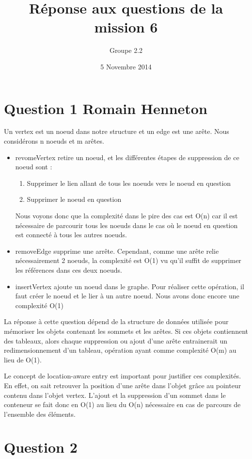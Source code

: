 \documentclass[10pt,a4paper]{article}
\date{5 Novembre 2014}
\author{Groupe 2.2}
\title{Réponse aux questions de la mission 6}
\begin{document}
\maketitle

\section*{Question 1 Romain Henneton}
Un vertex est un noeud dans notre structure et un edge est une arête. Nous considérons n noeuds et m arêtes.
\begin{itemize}
\item revomeVertex retire un noeud, et les différentes étapes de suppression de ce noeud sont :
\begin{enumerate}
\item Supprimer le lien allant de tous les noeuds vers le noeud en question
\item Supprimer le noeud en question
\end{enumerate}
Nous voyons donc que la complexité dans le pire des cas est O(n) car il est nécessaire de parcourir tous les noeuds dans le cas où le noeud en question est connecté à tous les autres noeuds.
\item removeEdge supprime une arrête. Cependant, comme une arête relie nécessairement 2 noeuds, la complexité est O(1) vu qu'il suffit de supprimer les références dans ces deux noeuds.
\item insertVertex ajoute un noeud dans le graphe. Pour réaliser cette opération, il faut créer le noeud et le lier à un autre noeud. Nous avons donc encore une complexité O(1)
\end{itemize}

La réponse à cette question dépend de la structure de données utilisée pour mémoriser les objets contenant les sommets et les arêtes. Si ces objets contiennent des tableaux, alors chaque suppression ou ajout d'une arête entrainerait un redimensionnement d'un tableau, opération ayant comme complexité O(m) au lieu de O(1).

Le concept de location-aware entry est important pour justifier ces complexités. En effet, on sait retrouver la position d'une arête dans l'objet grâce au pointeur contenu dans l'objet vertex. L'ajout et la suppression d'un sommet dans le conteneur se fait donc en O(1) au lieu du O(n) nécessaire en cas de parcours de l'ensemble des éléments.
\section*{Question 2}
\end{document}

